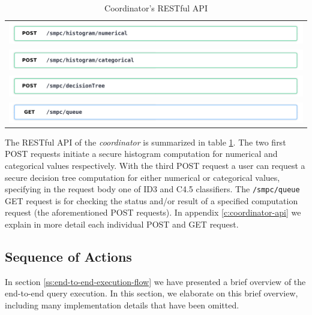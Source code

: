 \begin{table}[H]
  \centering
  \caption{Coordinator's RESTful API}
  \label{t:coordinator-api}
\begin{tabular}{l}
  \hyperref[s:post1]{\includegraphics[page=1,width=\textwidth]{figures/post1.pdf}} \\
  \hyperref[s:post2]{\includegraphics[page=1,width=\textwidth]{figures/post2.pdf}} \\
  \hyperref[s:post3]{\includegraphics[page=1,width=\textwidth]{figures/post3.pdf}} \\
  \hyperref[s:get1]{\includegraphics[page=1,width=\textwidth]{figures/get1.pdf}} \\
\end{tabular}
\end{table}


The RESTful API of the \textit{coordinator} is summarized in table \ref{t:coordinator-api}.
The two first POST requests initiate a secure histogram computation for numerical and categorical values respectively.
With the third POST request a user can request a secure decision tree computation for either numerical or categorical values, specifying in the request body one of ID3 and C4.5 classifiers.
The \texttt{/smpc/queue} GET request is for checking the status and/or result of a specified computation request (the aforementioned POST requests).
In appendix \ref{c:coordinator-api} we explain in more detail each individual POST and GET request.


\subsection{Sequence of Actions}\label{ss:coordinator-sequence}

In section \ref{ss:end-to-end-execution-flow} we have presented a brief overview of the end\hyp to\hyp end query execution.
In this section, we elaborate on this brief overview, including many implementation details that have been omitted.

